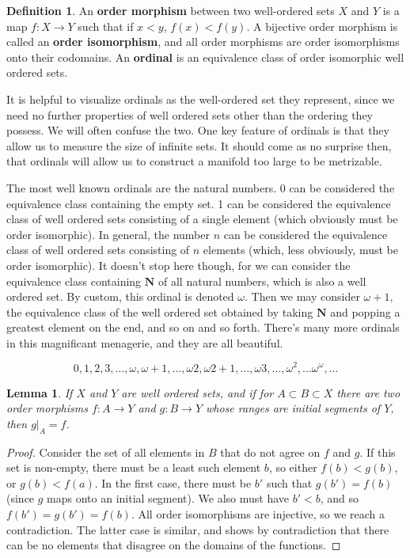 \documentclass[12pt]{report}
\theoremstyle{plain}
\newtheorem{lemma}[theorem]{Lemma}
\theoremstyle{definition}
\newtheorem*{defi}{Definition}
\newenvironment{definition}
    {\begin{samepage}\begin{framed}\begin{defi}}
    {\end{defi}\end{framed}\end{samepage}}
\begin{document}
\begin{definition}
    An {\bf order morphism} between two well-ordered sets $X$ and $Y$ is a map $f:X \to Y$ such that if $x < y$, $f(x) < f(y)$. A bijective order morphism is called an {\bf order isomorphism}, and all order morphisms are order isomorphisms onto their codomains. An {\bf ordinal} is an equivalence class of order isomorphic well ordered sets.
\end{definition}

It is helpful to visualize ordinals as the well-ordered set they represent, since we need no further properties of well ordered sets other than the ordering they possess. We will often confuse the two. One key feature of ordinals is that they allow us to measure the size of infinite sets. It should come as no surprise then, that ordinals will allow us to construct a manifold too large to be metrizable.

The most well known ordinals are the natural numbers. 0 can be considered the equivalence class containing the empty set. 1 can be considered the equivalence class of well ordered sets consisting of a single element (which obviously must be order isomorphic). In general, the number $n$ can be considered the equivalence class of well ordered sets consisting of $n$ elements (which, less obviously, must be order isomorphic). It doesn't stop here though, for we can consider the equivalence class containing $\mathbf{N}$ of all natural numbers, which is also a well ordered set. By custom, this ordinal is denoted $\omega$. Then we may consider $\omega + 1$, the equivalence class of the well ordered set obtained by taking $\mathbf{N}$ and popping a greatest element on the end, and so on and so forth. There's many more ordinals in this magnificant menagerie, and they are all beautiful.

\[ 0, 1, 2, 3, \dots, \omega, \omega + 1, \dots, \omega 2, \omega 2 + 1, \dots, \omega 3, \dots, \omega^2, \dots \omega^\omega, \dots  \]

\begin{lemma}
    If $X$ and $Y$ are well ordered sets, and if for $A \subset B \subset X$ there are two order morphisms $f:A \to Y$ and $g:B \to Y$ whose ranges are initial segments of $Y$, then $g|_A = f$.
\end{lemma}
\begin{proof}
    Consider the set of all elements in $B$ that do not agree on $f$ and $g$. If this set is non-empty, there must be a least such element $b$, so either $f(b) < g(b)$, or $g(b) < f(a)$. In the first case, there must be $b'$ such that $g(b') = f(b)$ (since $g$ maps onto an initial segment). We also must have $b' < b$, and so $f(b') = g(b') = f(b)$. All order isomorphisms are injective, so we reach a contradiction. The latter case is similar, and shows by contradiction that there can be no elements that disagree on the domains of the functions.
\end{proof}
\end{document}
